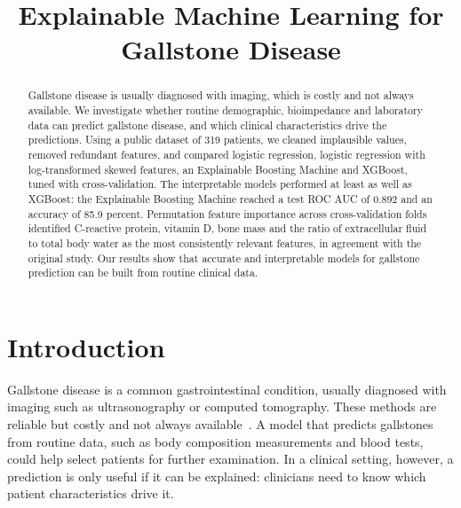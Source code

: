 \documentclass[conference]{IEEEtran}
\begin{document}
\title{Explainable Machine Learning for Gallstone Disease}

\author{
\and
{}
\and
{}
}

\maketitle

\begin{abstract}
Gallstone disease is usually diagnosed with imaging, which is costly and not
always available. We investigate whether routine demographic, bioimpedance and
laboratory data can predict gallstone disease, and which clinical
characteristics drive the predictions. Using a public dataset of 319 patients,
we cleaned implausible values, removed redundant features, and compared
logistic regression, logistic regression with log-transformed skewed features,
an Explainable Boosting Machine and XGBoost, tuned with cross-validation. The
interpretable models performed at least as well as XGBoost: the Explainable
Boosting Machine reached a test ROC AUC of 0.892 and an accuracy of 85.9
percent. Permutation feature importance across cross-validation folds
identified C-reactive protein, vitamin D, bone mass and the ratio of
extracellular fluid to total body water as the most consistently relevant
features, in agreement with the original study. Our results show that accurate
and interpretable models for gallstone prediction can be built from routine
clinical data.
\end{abstract}

\section{Introduction}
\label{sec:introduction}

Gallstone disease is a common gastrointestinal condition, usually diagnosed
with imaging such as ultrasonography or computed tomography. These methods are
reliable but costly and not always available~\cite{esen2024gallstone}. A model
that predicts gallstones from routine data, such as body composition
measurements and blood tests, could help select patients for further
examination. In a clinical setting, however, a prediction is only useful if
it can be explained: clinicians need to know which patient characteristics
drive it.
\end{document}
